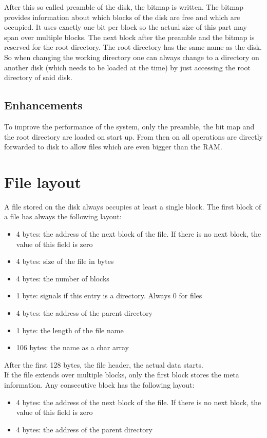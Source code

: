 \documentclass{report}
\begin{document}
After this so called preamble of the disk, the bitmap is written. The bitmap provides information about which blocks of the disk are free and which are occupied. It uses exactly one bit per block so the actual size of this part may span over multiple blocks. The next block after the preamble and the bitmap is reserved for the root directory. The root directory has the same name as the disk. So when changing the working directory one can always change to a directory on another disk (which needs to be loaded at the time) by just accessing the root directory of said disk.\\

\subsection{Enhancements}
To improve the performance of the system, only the preamble, the bit map and the root directory are loaded on start up. From then on all operations are directly forwarded to disk to allow files which are even bigger than the RAM.


\section{File layout}
A file stored on the disk always occupies at least a single block. The first block of a file has always the following layout:
\begin{itemize}
\item 4 bytes: the address of the next block of the file. If there is no next block, the value of this field is zero
\item 4 bytes: size of the file in bytes
\item 4 bytes: the number of blocks
\item 1 byte: signals if this entry is a directory. Always 0 for files
\item 4 bytes: the address of the parent directory
\item 1 byte: the length of the file name
\item 106 bytes: the name as a char array
\end{itemize}

After the first 128 bytes, the file header, the actual data starts.\\
If the file extends over multiple blocks, only the first block stores the meta information. Any consecutive block has the following layout:
\begin{itemize}
\item 4 bytes: the address of the next block of the file. If there is no next block, the value of this field is zero
\item 4 bytes: the address of the parent directory
\end{itemize}
\end{document}
